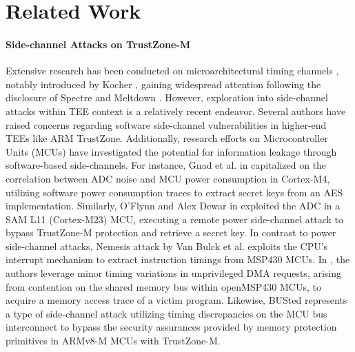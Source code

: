 \section{Related Work}\label{sec:related3}

\paragraph{\textbf{Side-channel Attacks on TrustZone-M}}
%
Extensive research has been conducted on microarchitectural timing channels
\cite{timingattack}, notably introduced by Kocher \cite{Kocher96}, gaining
widespread attention following the disclosure of Spectre \cite{spectre} and
Meltdown \cite{meltdown}. However, exploration into side-channel attacks
within TEE context is a relatively recent endeavor.  Several authors
\cite{loadstep, truspy, Bypassed, Qualcomm, vanbulckphdthesis,
gross2019breaking, surveyonTEE} have raised concerns regarding software
side-channel vulnerabilities in higher-end TEEs like ARM TrustZone.
Additionally, research efforts on Microcontroller Units (MCUs)
\cite{Nemesis, marton, busted, returntononsecure, oflynn2019ondevice,
barenghi2021cortexm, gnad2019leakynoise} have investigated the potential
for information leakage through software-based side-channels. For instance,
Gnad et al. in \cite{gnad2019leakynoise} capitalized on the correlation
between ADC noise and MCU power consumption in Cortex-M4, utilizing
software power consumption traces to extract secret keys from an AES
implementation. Similarly, O'Flynn and Alex Dewar in
\cite{oflynn2019ondevice} exploited the ADC in a SAM L11 (Cortex-M23) MCU,
executing a remote power side-channel attack to bypass TrustZone-M
protection and retrieve a secret key. In contrast to power side-channel
attacks, Nemesis attack by Van Bulck et al. \cite{Nemesis} exploits the
CPU's interrupt mechanism to extract instruction timings from MSP430 MCUs.
In \cite{marton}, the authors leverage minor timing variations in
unprivileged DMA requests, arising from contention on the shared memory bus
within openMSP430 MCUs, to acquire a memory access trace of a victim
program. Likewise, BUSted \cite{busted} represents a type of side-channel
attack utilizing timing discrepancies on the MCU bus interconnect to bypass
the security assurances provided by memory protection primitives in ARMv8-M
MCUs with TrustZone-M.
 
